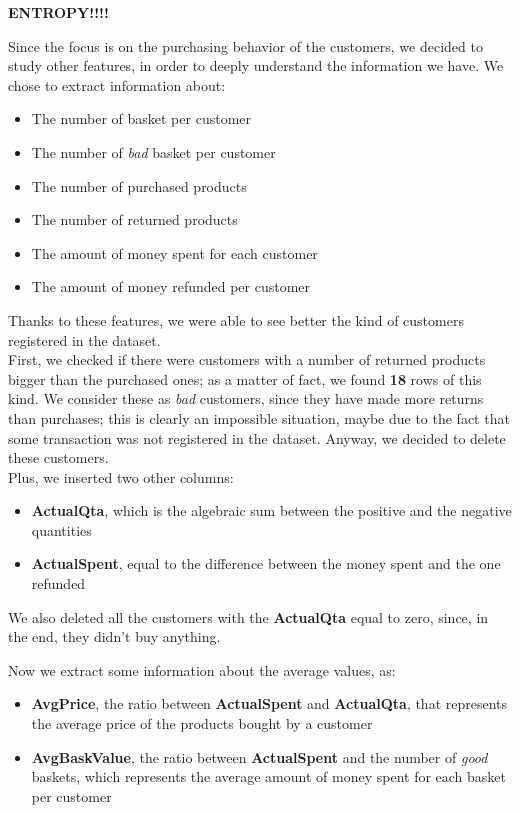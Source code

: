 \textbf{ENTROPY!!!!}

Since the focus is on the purchasing behavior of the customers, we decided to study other features, in order to deeply understand the information we have. We chose to extract information about:
\begin{itemize}
\item The number of basket per customer
\item The number of \emph{bad} basket per customer
\item The number of purchased products
\item The number of returned products
\item The amount of money spent for each customer
\item The amount of money refunded per customer
\end{itemize}

Thanks to these features, we were able to see better the kind of customers registered in the dataset.\\
First, we checked if there were customers with a number of returned products bigger than the purchased ones; as a matter of fact, we found \textbf{18} rows of this kind. We consider these as \emph{bad} customers, since they have made more returns than purchases; this is clearly an impossible situation, maybe due to the fact that some transaction was not registered in the dataset.
Anyway, we decided to delete these customers.\\
Plus, we inserted two other columns:
\begin{itemize}
\item \textbf{ActualQta}, which is the algebraic sum between the positive and the negative quantities
\item \textbf{ActualSpent}, equal to the difference between the money spent and the one refunded
\end{itemize}

We also deleted all the customers with the \textbf{ActualQta} equal to zero, since, in the end, they didn't buy anything. 

Now we extract some information about the average values, as:
\begin{itemize}
\item \textbf{AvgPrice}, the ratio between \textbf{ActualSpent} and \textbf{ActualQta}, that represents the average price of the products bought by a customer
\item \textbf{AvgBaskValue}, the ratio between \textbf{ActualSpent} and the number of \emph{good} baskets, which represents the average amount of money spent for each basket per customer
\end{itemize}

